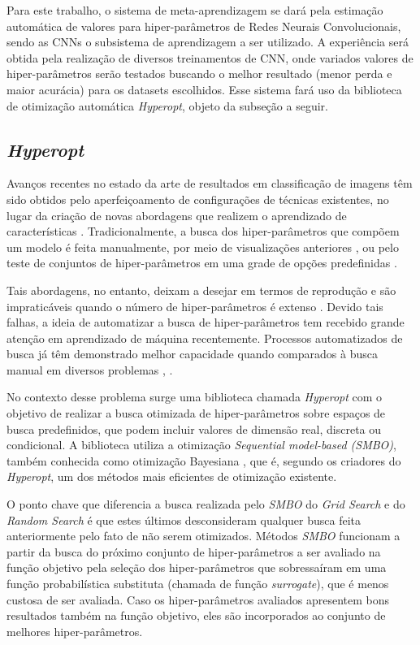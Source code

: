 \documentclass[
12pt,       %
openright,      %
oneside,      %
a4paper,      %
english,      %
french,       %
spanish,      %
brazil        %
]{abntex2}
\begin{document}
Para este trabalho, o sistema de meta-aprendizagem se dará pela estimação automática de valores para hiper-parâmetros de Redes Neurais Convolucionais, sendo as CNNs o subsistema de aprendizagem a ser utilizado. A experiência será obtida pela realização de diversos treinamentos de CNN, onde variados valores de hiper-parâmetros serão testados buscando o melhor resultado (menor perda e maior acurácia) para os datasets escolhidos. Esse sistema fará uso da biblioteca de otimização automática \textit{Hyperopt}, objeto da subseção a seguir.

\subsection{\textit{Hyperopt}} \label{hyperopt}

Avanços recentes no estado da arte de resultados em classificação de imagens têm sido obtidos pelo aperfeiçoamento de configurações de técnicas existentes, no lugar da criação de novas abordagens que realizem o aprendizado de características \cite{bergstra2011algorithms}. Tradicionalmente, a busca dos hiper-parâmetros que compõem um modelo é feita manualmente, por meio de visualizações anteriores \cite{Hinton2012}, \cite{Hsu2003APG} ou pelo teste de conjuntos de hiper-parâmetros em uma grade de opções predefinidas \cite{Pedregosa2011}. 

Tais abordagens, no entanto, deixam a desejar em termos de reprodução e são impraticáveis quando o número de hiper-parâmetros é extenso \cite{ClaesenM15}. Devido tais falhas, a ideia de automatizar a busca de hiper-parâmetros tem recebido grande atenção em aprendizado de máquina recentemente. Processos automatizados de busca já têm demonstrado melhor capacidade quando comparados à busca manual em diversos problemas \cite{Bergstra2011}, \cite{Bergstra2012}.

No contexto desse problema surge uma biblioteca chamada \textit{Hyperopt} \cite{bergstra2013hyperopt} com o objetivo de realizar a busca otimizada de hiper-parâmetros sobre espaços de busca predefinidos, que podem incluir valores de dimensão real, discreta ou condicional. A biblioteca utiliza a otimização \textit{Sequential model-based (SMBO)}, também conhecida como otimização Bayesiana \cite{Pelikan1999}, que é, segundo os criadores do \textit{Hyperopt}, um dos métodos mais eficientes de otimização existente.

O ponto chave que diferencia a busca realizada pelo \textit{SMBO} do \textit{Grid Search} e do \textit{Random Search} é que estes últimos desconsideram qualquer busca feita anteriormente pelo fato de não serem otimizados. Métodos \textit{SMBO} funcionam a partir da busca do próximo conjunto de hiper-parâmetros a ser avaliado na função objetivo pela seleção dos hiper-parâmetros que sobressaíram em uma função probabilística substituta (chamada de função \textit{surrogate}), que é menos custosa de ser avaliada. Caso os hiper-parâmetros avaliados apresentem bons resultados também na função objetivo, eles são incorporados ao conjunto de melhores hiper-parâmetros.
\end{document}
